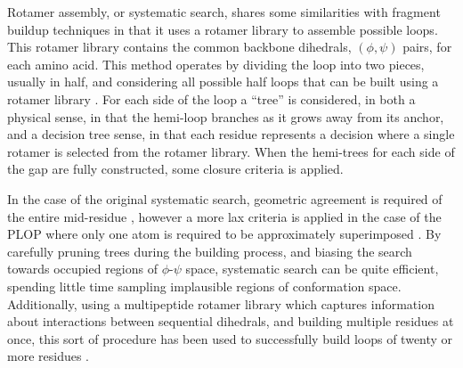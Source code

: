 Rotamer assembly, or systematic search, shares some similarities with fragment buildup techniques in that it uses a rotamer library to assemble possible loops.
This rotamer library contains the common backbone dihedrals, $(\phi,\psi)$ pairs, for each amino acid.
This method operates by dividing the loop into two pieces, usually in half, and considering all possible half loops that can be built using a rotamer library \cite{moult1986algorithm}.
For each side of the loop a ``tree'' is considered, in both a physical sense, in that the hemi-loop branches as it grows away from its anchor, and a decision tree sense, in that each residue represents a decision where a single rotamer is selected from the rotamer library.
When the hemi-trees for each side of the gap are fully constructed, some closure criteria is applied.

In the case of the original systematic search, geometric agreement is required of the entire mid-residue \cite{moult1986algorithm}, however a more lax criteria is applied in the case of the PLOP where only one atom is required to be approximately superimposed \cite{jacobson2004hierarchical}.
By carefully pruning trees during the building process, and biasing the search towards occupied regions of $\phi$-$\psi$ space, systematic search can be quite efficient, spending little time sampling implausible regions of conformation space.
Additionally, using a multipeptide rotamer library which captures information about interactions between sequential dihedrals, and building multiple residues at once, this sort of procedure has been used to successfully build loops of twenty or more residues \cite{zhao2011progress}.
